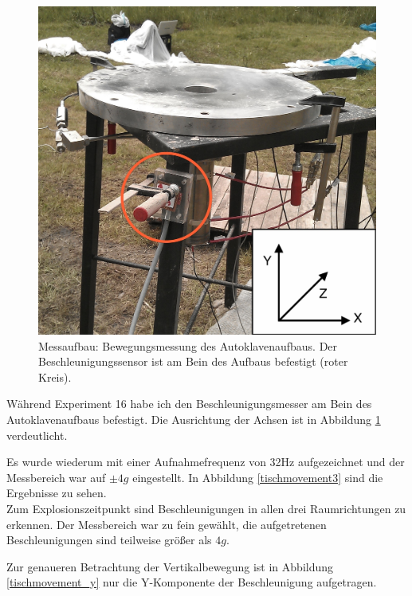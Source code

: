 \documentclass[12pt,a4paper]{scrartcl}
\begin{document}
\begin{figure}[H]
\centering
\includegraphics[scale=.13]{hardwareimages/tisch.jpg}
\caption{Messaufbau: Bewegungsmessung des Autoklavenaufbaus. Der Beschleunigungssensor ist am Bein des Aufbaus befestigt (roter Kreis).}
\label{tisch}
\end{figure}

Während Experiment 16 habe ich den Beschleunigungsmesser am Bein des Autoklavenaufbaus befestigt. Die Ausrichtung der Achsen ist in Abbildung \ref{tisch} verdeutlicht.

Es wurde wiederum mit einer Aufnahmefrequenz von 32Hz aufgezeichnet und der Messbereich war auf $\pm 4g$ eingestellt.
In Abbildung \ref{tischmovement3} sind die Ergebnisse zu sehen.\\

Zum Explosionszeitpunkt sind Beschleunigungen in allen drei Raumrichtungen zu erkennen. Der Messbereich war zu fein gewählt, die aufgetretenen Beschleunigungen sind teilweise größer als $4g$. 

Zur genaueren Betrachtung der Vertikalbewegung ist in Abbildung \ref{tischmovement_y} nur die Y-Komponente der Beschleunigung aufgetragen. 
\end{document}

